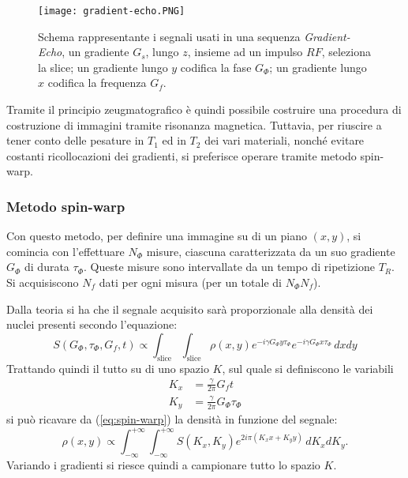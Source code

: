 \begin{figure}[ht]
\centering
\texttt{[image: gradient-echo.PNG]}
\caption{Schema rappresentante i segnali usati in una sequenza \textit{Gradient-Echo}, un gradiente $G_s$, lungo $z$, insieme ad un impulso $RF$, seleziona la slice; un gradiente lungo $y$ codifica la fase $G_\Phi$; un gradiente lungo $x$ codifica la frequenza $G_f$.}
\label{fig:GEcho}
\end{figure}

Tramite il principio zeugmatografico è quindi possibile costruire una procedura di costruzione di immagini tramite risonanza magnetica. 
Tuttavia, per riuscire a tener conto delle pesature in $T_1$ ed in $T_2$ dei vari materiali, nonché evitare costanti ricollocazioni dei gradienti, si preferisce operare tramite metodo spin-warp.

\subsubsection*{Metodo spin-warp}

Con questo metodo, per definire una immagine su di un piano $(x,y)$, si comincia con l'effettuare $N_{\Phi}$ misure, ciascuna caratterizzata da un suo gradiente $G_{\Phi}$ di durata $\tau_{\Phi}$. Queste misure sono intervallate da un tempo di ripetizione $T_R$. Si acquisiscono $N_f$ dati per ogni misura (per un totale di $N_{\Phi}N_f$).

Dalla teoria si ha che il segnale acquisito sarà proporzionale alla densità dei nuclei presenti secondo l'equazione:
\begin{equation}
	S(G_{\Phi}, \tau_{\Phi}, G_f, t) \propto \int_{\text{slice}}\int_{\text{slice}} \rho(x,y) e^{-i\gamma G_\Phi y \tau_\Phi}e^{-i\gamma G_\Phi x \tau_\Phi} \, dxdy
	\label{eq:spin-warp}
\end{equation}
Trattando quindi il tutto su di uno spazio $K$, sul quale si definiscono le variabili
\begin{align}
	K_x &= \frac{\gamma}{2\pi}G_f t \\
	K_y &= \frac{\gamma}{2\pi}G_\Phi \tau_\Phi
\end{align}
si può ricavare da (\ref{eq:spin-warp}) la densità in funzione del segnale:
\begin{equation}
	\rho(x,y) \propto \int_{-\infty}^{+\infty}\int_{-\infty}^{+\infty} S(K_x,K_y) e^{2i\pi(K_x x +K_y y)}\, dK_x dK_y    .
\end{equation}
Variando i gradienti si riesce quindi a campionare tutto lo spazio $K$.


